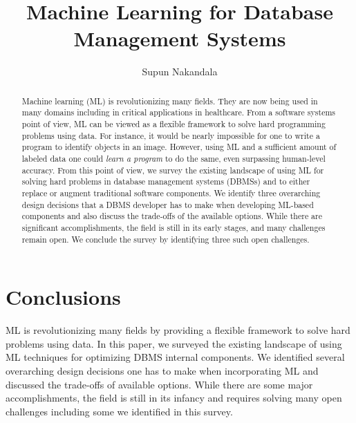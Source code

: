 \documentclass[sigconf, 10pt]{acmart}
\newcommand{\titlename}{Machine Learning for Database Management Systems}
\begin{document}
\sloppy
\title{\titlename}

\author{Supun Nakandala}


\begin{abstract}
Machine learning (ML) is revolutionizing many fields. They are now being used in many domains including in critical applications in healthcare. From a software systems point of view, ML can be viewed as a flexible framework to solve hard programming problems using data. For instance, it would be nearly impossible for one to write a program to identify objects in an image. However, using ML and a sufficient amount of labeled data one could \textit{learn a program} to do the same, even surpassing human-level accuracy. From this point of view, we survey the existing landscape of using ML for solving hard problems in database management systems (DBMSs) and to either replace or augment traditional software components. We identify three overarching design decisions that a DBMS developer has to make when developing ML-based components and also discuss the trade-offs of the available options. While there are significant accomplishments, the field is still in its early stages, and many challenges remain open. We conclude the survey by identifying three such open challenges.
\end{abstract}

\maketitle









\section{Conclusions}
ML is revolutionizing many fields by providing a flexible framework to solve hard problems using data.
In this paper, we surveyed the existing landscape of using ML techniques for optimizing DBMS internal components.
We identified several overarching design decisions one has to make when incorporating ML and discussed the trade-offs of available options.
While there are some major accomplishments, the field is still in its infancy and requires solving many open challenges including some we identified in this survey.




\balance

\end{document}
